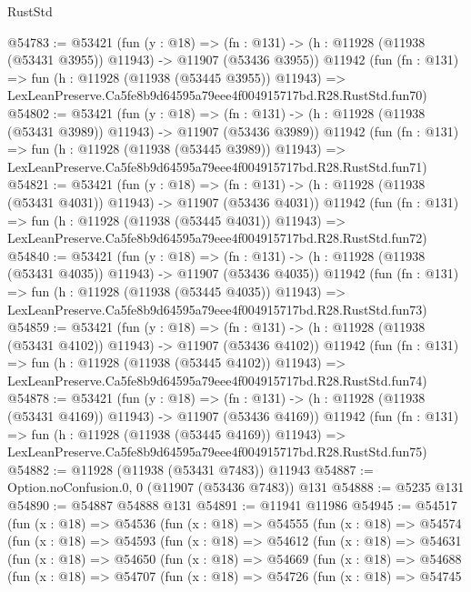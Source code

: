 \begin{lexlean}{RustStd}
\begin{coremodule}
@54783 := @53421
    (fun (y : @18) =>
    (fn : @131) -> (h : @11928 (@11938 (@53431 @3955)) @11943) -> @11907 (@53436 @3955))
    @11942
    (fun (fn : @131) =>
    fun (h : @11928 (@11938 (@53445 @3955)) @11943) =>
    LexLeanPreserve.Ca5fe8b9d64595a79eee4f004915717bd.R28.RustStd.fun70)
@54802 := @53421
    (fun (y : @18) =>
    (fn : @131) -> (h : @11928 (@11938 (@53431 @3989)) @11943) -> @11907 (@53436 @3989))
    @11942
    (fun (fn : @131) =>
    fun (h : @11928 (@11938 (@53445 @3989)) @11943) =>
    LexLeanPreserve.Ca5fe8b9d64595a79eee4f004915717bd.R28.RustStd.fun71)
@54821 := @53421
    (fun (y : @18) =>
    (fn : @131) -> (h : @11928 (@11938 (@53431 @4031)) @11943) -> @11907 (@53436 @4031))
    @11942
    (fun (fn : @131) =>
    fun (h : @11928 (@11938 (@53445 @4031)) @11943) =>
    LexLeanPreserve.Ca5fe8b9d64595a79eee4f004915717bd.R28.RustStd.fun72)
@54840 := @53421
    (fun (y : @18) =>
    (fn : @131) -> (h : @11928 (@11938 (@53431 @4035)) @11943) -> @11907 (@53436 @4035))
    @11942
    (fun (fn : @131) =>
    fun (h : @11928 (@11938 (@53445 @4035)) @11943) =>
    LexLeanPreserve.Ca5fe8b9d64595a79eee4f004915717bd.R28.RustStd.fun73)
@54859 := @53421
    (fun (y : @18) =>
    (fn : @131) -> (h : @11928 (@11938 (@53431 @4102)) @11943) -> @11907 (@53436 @4102))
    @11942
    (fun (fn : @131) =>
    fun (h : @11928 (@11938 (@53445 @4102)) @11943) =>
    LexLeanPreserve.Ca5fe8b9d64595a79eee4f004915717bd.R28.RustStd.fun74)
@54878 := @53421
    (fun (y : @18) =>
    (fn : @131) -> (h : @11928 (@11938 (@53431 @4169)) @11943) -> @11907 (@53436 @4169))
    @11942
    (fun (fn : @131) =>
    fun (h : @11928 (@11938 (@53445 @4169)) @11943) =>
    LexLeanPreserve.Ca5fe8b9d64595a79eee4f004915717bd.R28.RustStd.fun75)
@54882 := @11928 (@11938 (@53431 @7483)) @11943
@54887 := Option.noConfusion.{0, 0} (@11907 (@53436 @7483)) @131
@54888 := @5235 @131
@54890 := @54887 @54888 @131
@54891 := @11941 @11986
@54945 := @54517
    (fun (x : @18) =>
    @54536
      (fun (x : @18) =>
      @54555
        (fun (x : @18) =>
        @54574
          (fun (x : @18) =>
          @54593
            (fun (x : @18) =>
            @54612
              (fun (x : @18) =>
              @54631
                (fun (x : @18) =>
                @54650
                  (fun (x : @18) =>
                  @54669
                    (fun (x : @18) =>
                    @54688
                      (fun (x : @18) =>
                      @54707
                        (fun (x : @18) =>
                        @54726
                          (fun (x : @18) =>
                          @54745

\end{coremodule}
\end{lexlean}
